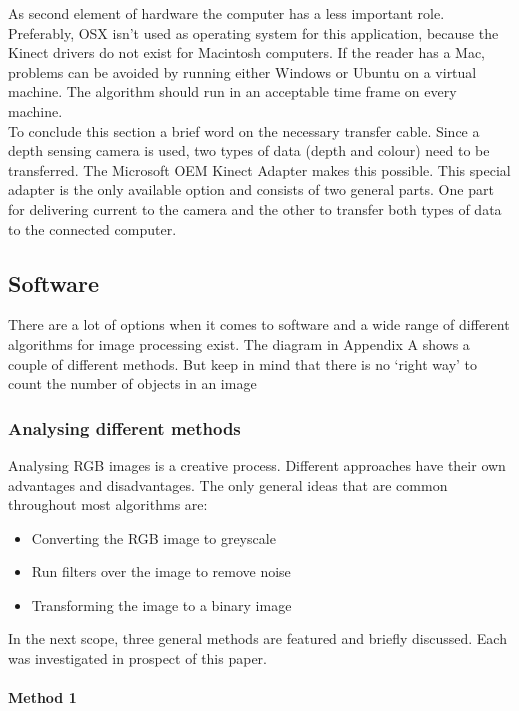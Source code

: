 \documentclass{article}
\begin{document}
As second element of hardware the computer has a less important role. Preferably, OSX isn't used as operating system for this application, because the Kinect drivers do not exist for Macintosh computers. If the reader has a Mac, problems can be avoided by running either Windows or Ubuntu on a virtual machine. The algorithm should run in an acceptable time frame on every machine.\\
To conclude this section a brief word on the necessary transfer cable. Since a depth sensing camera is used, two types of data (depth and colour) need to be transferred. The Microsoft OEM Kinect Adapter makes this possible. This special adapter is the only available option and consists of two general parts. One part for delivering current to the camera and the other to transfer both types of data to the connected computer.

\subsection{Software}
There are a lot of options when it comes to software and a wide range of different algorithms for image processing exist. The diagram in Appendix A shows a couple of different methods. But keep in mind that there is no ‘right ­way’ to count the number of objects in an image

\subsubsection{Analysing different methods}
Analysing RGB images is a creative process. Different approaches have their own advantages and disadvantages. The only general ideas that are common throughout most algorithms are:
\begin{itemize}
\item Converting the RGB image to greyscale
\item Run filters over the image to remove noise
\item Transforming the image to a binary image
\end{itemize}
In the next scope, three general methods are featured and briefly discussed. Each was investigated in prospect of this paper.
\paragraph{Method 1}
\end{document}
